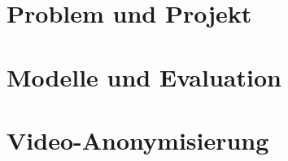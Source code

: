 
\section{Problem und Projekt}













\section{Modelle und Evaluation}















\section{Video-Anonymisierung}








